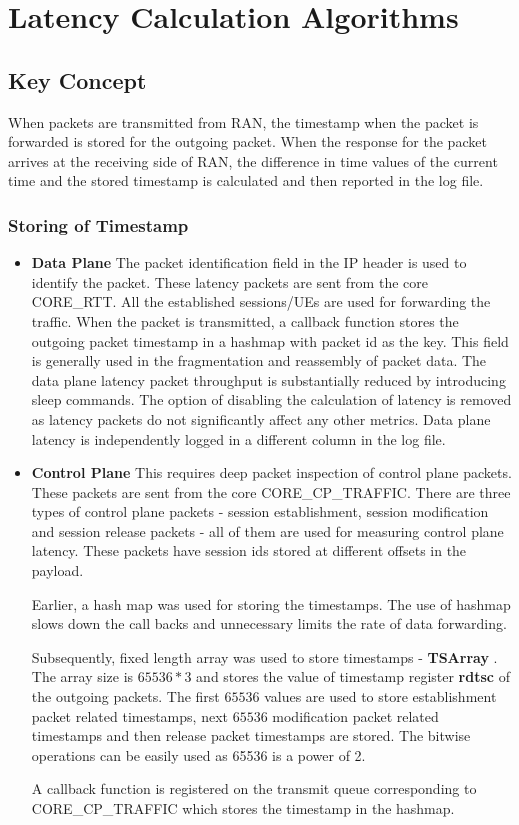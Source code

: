 \section{Latency Calculation Algorithms}
\subsection{Key Concept}
When packets are transmitted from RAN, the timestamp when the packet is forwarded is stored for the outgoing packet. When the response for the packet arrives at the receiving side of RAN, the difference in time values of the current time and the stored timestamp  is calculated and then reported in the log file.
\subsubsection{Storing of Timestamp}
\begin{itemize}
	\item \textbf{Data Plane} The packet identification field in the IP header is used to identify the packet. These latency packets
	      are sent from the core CORE\_RTT. All the established sessions/UEs are used for forwarding the traffic. When the packet is
	      transmitted, a callback  function stores the outgoing packet timestamp in a hashmap with packet id as the key. This field is
	      generally used in the fragmentation and reassembly of packet data. The data plane latency packet throughput is substantially reduced by introducing sleep commands. The option of disabling the calculation of latency is removed as latency packets do not significantly affect any other metrics. Data plane latency is independently logged in a different column in the log file.
	\item \textbf{Control Plane}
	      This requires deep packet inspection of control plane packets. These packets are sent from the core CORE\_CP\_TRAFFIC.
	      There are three types of control plane packets - session establishment, session modification and session release packets - all of
	      them are used for measuring control plane latency. These packets have session ids stored at
	      different offsets in the payload.

	      Earlier, a hash map was used for storing the timestamps. The use of hashmap slows down the call backs and unnecessary limits the rate of data forwarding.

	      Subsequently, fixed length array was used to store timestamps - \textbf{TSArray} . The
	      array size is $65536 * 3$ and stores the value of timestamp register \textbf{rdtsc} of the
	      outgoing packets. The first $65536$ values are used to store establishment packet related
	      timestamps, next $65536$ modification packet related timestamps and then release packet
	      timestamps are stored.
	      The bitwise operations can be easily used as 65536 is a power of 2.


	      A callback function is registered on  the transmit queue corresponding to CORE\_CP\_TRAFFIC which stores the timestamp in the hashmap.
\end{itemize}

